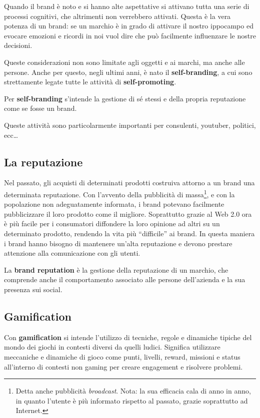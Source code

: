 Quando il brand è noto e si hanno alte aspettative si attivano tutta una serie
di processi cognitivi, che altrimenti non verrebbero attivati. Questa è la vera
potenza di un brand: se un marchio è in grado di attivare il nostro ippocampo
ed evocare emozioni e ricordi in noi vuol dire che può facilmente influenzare
le nostre decisioni.

Queste considerazioni non sono limitate agli oggetti e ai marchi, ma anche alle
persone. Anche per questo, negli ultimi anni, è nato il \textbf{self-branding}, 
a cui sono strettamente legate tutte le attività di
\textbf{self-promoting}.
\begin{definition}
Per \textbf{self-branding} s'intende la gestione di sé stessi e della propria 
reputazione come se fosse un brand.
\end{definition}

Queste attività sono particolarmente importanti per 
consulenti, youtuber, politici, ecc\dots{}

\subsection{La reputazione}

Nel passato, gli acquisti di determinati prodotti costruiva attorno a un brand
una determinata reputazione. Con l'avvento della pubblicità di
massa\footnote{Detta anche pubblicità \textit{broadcast}. Nota: la sua
efficacia cala di anno in anno, in quanto l'utente è più informato rispetto al
passato, grazie soprattutto ad Internet.}, e con la popolazione non
adeguatamente informata, i brand potevano facilmente pubblicizzare
il loro prodotto come il migliore. Soprattutto grazie al Web 2.0 ora
è più facile per i consumatori diffondere la loro opinione ad altri su un
determinato prodotto, rendendo la vita più ``difficile'' ai brand. In questa
maniera i brand hanno bisogno di mantenere un'alta reputazione e devono
prestare attenzione alla comunicazione con gli utenti.

La \textbf{brand reputation} è la gestione della reputazione di un marchio, che
comprende anche il comportamento associato alle persone dell'azienda e la sua
presenza sui social.

\subsection{Gamification}

\begin{definition}[Gamification]
Con \textbf{gamification} si intende l'utilizzo di tecniche, regole e dinamiche
tipiche del mondo dei giochi in contesti diversi da quelli ludici.
Significa utilizzare meccaniche e dinamiche di gioco come punti, livelli,
reward, missioni e status all'interno di contesti non gaming per creare
engagement e risolvere problemi. 
\end{definition}

